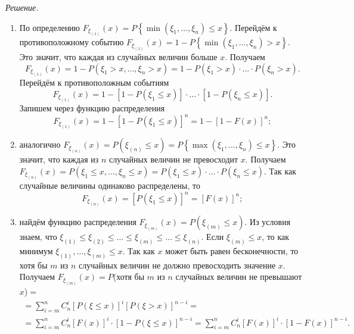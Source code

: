 \textit{Решение.}
\begin{enumerate}[label=\alph*)]
\item По определению
$F_{ \xi_{ \left( 1 \right) }} \left( x \right) =
P \left\{ \min \left( \xi_1, \dotsc, \xi_n \right) \leq x \right\}$.
Перейдём к противоположному событию
$F_{ \xi_{ \left( 1 \right) } } \left( x \right) =
1 - P \left\{ \min \left( \xi_1, \dotsc, \xi_n \right) > x \right\}$.
Это значит, что каждая из случайных величин больше $x$.
Получаем
$$F_{ \xi_{ \left( 1 \right) }} \left( x \right) =
1 - P \left( \xi_1 > x, \dotsc, \xi_n > x \right) =
1 - P \left( \xi_1 > x \right) \cdot \dotsc \cdot P \left( \xi_n > x \right).$$
Перейдём к противоположным событиям
$$F_{ \xi_{ \left( 1 \right) }} \left( x \right) =
1 - \left[ 1 - P \left( \xi_1 \leq x \right) \right] \cdot \dotsc \cdot \left[ 1 - P \left( \xi_n \leq x \right) \right].$$
Запишем через функцию распределения
$$F_{ \xi_{ \left( 1 \right) }} \left( x \right) =
1 - \left[ 1 - P \left( \xi_1 \leq x \right) \right]^n = 1 - \left[ 1 - F \left( x \right) \right]^n;$$
\item аналогично
$F_{ \xi_{ \left( n \right) }} \left( x \right) =
P \left( \xi_{ \left( n \right) } \leq x \right) =
P \left\{ \max \left( \xi_1, \dotsc, \xi_n \right) \leq x \right\}$.
Это значит, что каждая из $n$ случайных величин не превосходит $x$.
Получаем
$F_{ \xi_{ \left( n \right) }} \left( x \right) =
P \left( \xi_1 \leq x, \dotsc, \xi_n \leq x \right) =
P \left( \xi_1 \leq x \right) \cdot \dotsc \cdot P \left( \xi_n \leq x \right)$.
Так как случайные величины одинаково распределены, то
$$F_{ \xi_{ \left( n \right) }} \left( x \right) =
\left[ P \left( \xi_1 \leq x \right) \right]^n =
\left[ F \left( x \right) \right]^n;$$
\item  найдём функцию распределения $F_{ \xi_{\left( m \right) }} \left( x \right) = P \left( \xi_{ \left( m \right) } \leq x \right)$.
Из условия знаем, что $ \xi_{ \left( 1 \right) } \leq \xi_{ \left( 2 \right) } \leq \dotsc \leq \xi_{ \left( m \right) } \leq \dotsc \leq \xi_{ \left( n \right) }$.
Если $ \xi_{ \left( m \right) } \leq x$, то как минимум $ \xi_{ \left( 1 \right) }, \dotsc, \xi_{ \left( m \right) } \leq x$.
Так как $x$ может быть равен бесконечности, то хотя бы $m$ из $n$ случайных величин не должно превосходить значение $x$.
Получаем $F_{ \xi_{\left( m \right) }} \left( x \right) = P$(хотя бы $m$ из $n$ случайных величин не превышают $x$)$=$
\begin{equation*}
\begin{split}
= \sum \limits_{i=m}^n C_n^i \left[ P \left( \xi \leq x \right) \right]^i \left[ P \left( \xi > x \right) \right]^{n-i} = \\
= \sum \limits_{i=m}^n C_n^i \left[ F \left( x \right) \right]^i \cdot \left[ 1 - P \left( \xi \leq x \right) \right]^{n-i} =
\sum \limits_{i=m}^n C_n^i \left[ F \left( x \right) \right]^i \cdot \left[ 1 - F \left( x \right) \right]^{n-i}.
\end{split}
\end{equation*}
\end{enumerate}

